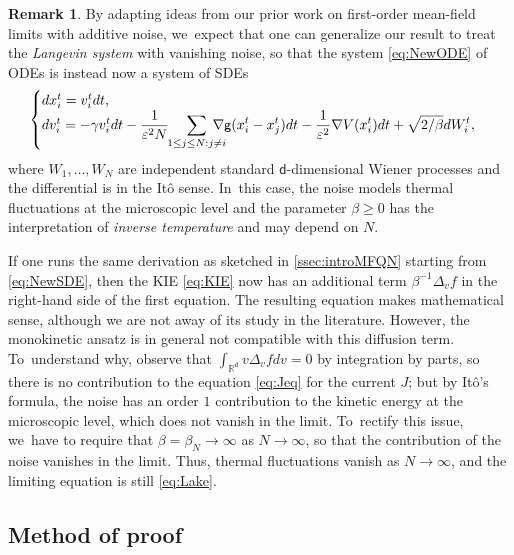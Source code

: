 \documentclass[10pt]{amsart}
\theoremstyle{plain}
\theoremstyle{definition}
\newtheorem{remark}[thm]{Remark}
\newcommand{\R}{{\mathbb{R}}}
\let\be\beta
\let\ga\gamma
\let\vep\varepsilon
\renewcommand{\d}{\mathsf{d}}
\newcommand{\g}{{\mathsf{g}}}
\begin{document}
\begin{remark}
By adapting ideas from our prior work \cite{RS2021} on first-order mean-field limits with additive noise, we~expect that one can generalize our result to treat the \emph{Langevin system} with vanishing noise, so that the system \eqref{eq:NewODE} of ODEs is instead now a system of SDEs
\begin{equation}\label{eq:NewSDE}
\begin{cases}
d{x}_i^t = v_i^tdt, \\
d{v}_i^t = -\ga v_i^tdt \displaystyle-\frac{1}{\vep^2 N}\hspace*{-1mm} \sum_{1\leq j\leq N: j\neq i}\hspace*{-4mm}\nabla\g(x_i^t-x_j^t)dt -\frac{1}{\vep^2}\nabla V(x_i^t)dt + \sqrt{2/\be}dW_i^t,
\end{cases}
\end{equation}
where $W_1,\ldots,W_N$ are independent standard $\d$-dimensional Wiener processes and the differential is in the Itô sense. In~this case, the noise models thermal fluctuations at the microscopic level and the parameter $\be\geq 0$ has the interpretation of \emph{inverse temperature} and may depend on $N$.

If one runs the same derivation as sketched in \cref{ssec:introMFQN} starting from \eqref{eq:NewSDE}, then the KIE \eqref{eq:KIE} now has an additional term $\be^{-1} \Delta_v f$ in the right-hand side of the first equation. The resulting equation makes mathematical sense, although we are not away of its study in the literature. However, the monokinetic ansatz is in general not compatible with this diffusion term. To~understand why, observe that $\int_{\R^\d}v\Delta_v f dv = 0$ by integration by parts, so there is no contribution to the equation \eqref{eq:Jeq} for the current $J$; but by Itô's formula, the noise has an order $1$ contribution to the kinetic energy at the microscopic level, which does not vanish in the limit. To~rectify this issue, we~have to require that $\be=\be_N \to\infty$ as $N\to\infty$, so that the contribution of the noise vanishes in the limit. Thus, thermal fluctuations vanish as $N\to\infty$, and the limiting equation is still \eqref{eq:Lake}.\end{remark}

\subsection{Method of proof}\label{ssec:introMPf}
\end{document}
